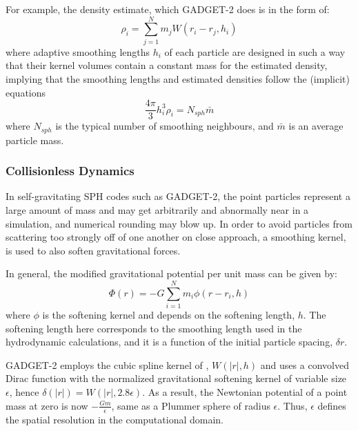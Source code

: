 For example, the density estimate,  which GADGET-2 does is in the form of:
\begin{equation}
    \rho_i = \sum_{j=1}^{N} m_j W(r_i -r_j,h_i)
\end{equation}
where adaptive smoothing lengths $h_i$ of each particle are designed in such a way that their kernel volumes contain a constant mass for the estimated density, implying that the smoothing lengths and estimated densities follow the (implicit) equations
\begin{equation}
    \frac{4\pi}{3} h_{i}^3 \rho_i = N_{sph} \bar{m}
\end{equation}
where $N_{sph}$ is the typical number of smoothing neighbours, and $\bar{m}$ is an average particle mass.

\subsubsection{Collisionless Dynamics}

In self-gravitating SPH codes such as GADGET-2, the point particles represent a large amount of mass and may get arbitrarily and abnormally near in a simulation, and numerical rounding may blow up. In order to avoid particles from scattering too strongly off of one another on close approach, a smoothing kernel, is used to also soften gravitational forces. 

In general, the modified gravitational potential per unit mass can be given by:
\begin{equation}\label{eq:softened_gravity}
   \Phi(r) = -G\sum_{i=1}^{N} m_i \phi(r-r_i,h)
\end{equation}
where $\phi$ is the softening kernel
and depends on the softening length, $h$. The softening length here corresponds to the smoothing length used in the hydrodynamic calculations, and it is a function of the initial particle spacing, $\delta r$.

GADGET-2 employs the cubic spline kernel of \cite{monaghan1985refined}, $W(|r|,h)$ and uses a convolved Dirac function  with the normalized gravitational softening kernel of variable size $\epsilon$, hence  $\delta(|r|) = W(|r|,2.8 \epsilon)$. As a result, the Newtonian potential of a point mass at zero is now $-\frac{Gm}{\epsilon}$, same as a Plummer sphere of radius $\epsilon$. Thus, $\epsilon$ defines the spatial resolution in the computational domain. 

